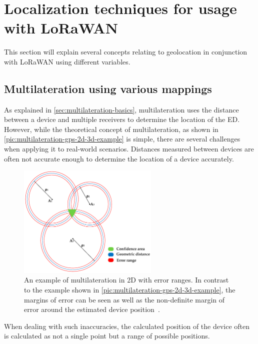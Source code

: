 \section{Localization techniques for usage with \acs{LoRaWAN}}\label{sec:lorawan-localization-techniques}

This section will explain several concepts relating to geolocation in conjunction with \ac{LoRaWAN} using different variables.

\subsection{Multilateration using various mappings}\label{sec:lorawan-multilateration}

As explained in \cref{sec:multilateration-basics}, multilateration uses the distance between a device and multiple receivers to determine the location of the \acl{ED}.
However, while the theoretical concept of multilateration, as shown in \cref{pic:multilateration-gps-2d-3d-example} is simple, there are several challenges when applying it to real-world scenarios.
Distances measured between devices are often not accurate enough to determine the location of a device accurately.

\begin{figure}[htbp]
    \centering
    \includegraphics[width=0.6\textwidth]{pictures/multilateration/multilateration_error_ranges.png}
    \caption{
        An example of multilateration in 2D with error ranges.
        In contrast to the example shown in \cref{pic:multilateration-gps-2d-3d-example}, the margins of error can be seen as well as the non-definite margin of error around the estimated device position~\protect\cite{kapoor_novel_2016}.
    }\label{pic:multilateration-with-error-ranges-example}
\end{figure}

When dealing with such inaccuracies, the calculated position of the device often is calculated as not a single point but a range of possible positions.

